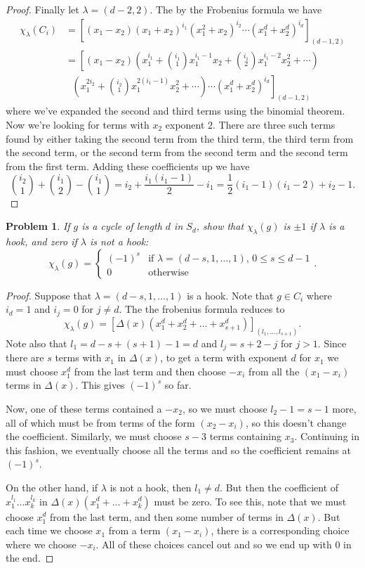 \documentclass{article}
\newtheorem{problem}{Problem}
\begin{document}
\begin{proof}
Finally let $\lambda = (d-2,2)$. The by the Frobenius formula we have
\begin{align*}
\chi_{\lambda}(C_i)
&= \left [(x_1-x_2)(x_1 + x_2)^{i_1}(x_1^2 + x_2)^{i_2} \cdots (x_1^d + x_2^d)^{i_d} \right ]_{(d-1,2)}\\
&= \left [(x_1-x_2) \left (x_1^{i_1} + \binom{i_1}{1} x_1^{i_1-1}x_2 + \binom{i_1}{2} x_1^{i_1-2}x_2^2 + \cdots \right ) \right.\\
&~~~\left. \left (x_1^{2i_2} + \binom{i_2}{1} x_1^{2(i_1-1)} x_2^2 + \cdots \right ) \cdots (x_1^d + x_2^d)^{i_d} \right ]_{(d-1,2)}
\end{align*}
where we've expanded the second and third terms using the binomial theorem. Now we're looking for terms with $x_2$ exponent $2$. There are three such terms found by either taking the second term from the third term, the third term from the second term, or the second term from the second term and the second term from the first term. Adding these coefficients up we have
\[
\binom{i_2}{1} + \binom{i_1}{2} - \binom{i_1}{1} = i_2 + \frac{i_1(i_1-1)}{2} - i_1 = \frac{1}{2} (i_1 - 1)(i_1 - 2) + i_2 - 1.
\]
\end{proof}

\begin{problem}
If $g$ is a cycle of length $d$ in $S_d$, show that $\chi_{\lambda}(g)$ is $\pm 1$ if $\lambda$ is a hook, and zero if $\lambda$ is not a hook:
\[
\chi_{\lambda}(g) =
\begin{cases}
(-1)^s & \text{if $\lambda = (d-s, 1, \dots , 1)$, $0 \leq s \leq d-1$}\\
0 & \text{otherwise}
\end{cases}.
\]
\end{problem}
\begin{proof}
Suppose that $\lambda = (d-s, 1, \dots , 1)$ is a hook. Note that $g \in C_i$ where $i_d = 1$ and $i_j = 0$ for $j \neq d$. The the frobenius formula reduces to
\[
\chi_{\lambda}(g) = [\Delta(x)(x_1^d + x_2^d + \dots + x_{s+1}^d)]_{(l_1, \dots , l_{s+1})}.
\]
Note also that $l_1 = d-s + (s+1)-1 = d$ and $l_j = s+2-j$ for $j > 1$. Since there are $s$ terms with $x_1$ in $\Delta(x)$, to get a term with exponent $d$ for $x_1$ we must choose $x_1^d$ from the last term and then choose $-x_i$ from all the $(x_1 - x_i)$ terms in $\Delta(x)$. This gives $(-1)^s$ so far.

Now, one of these terms contained a $-x_2$, so we must choose $l_2-1 = s-1$ more, all of which must be from terms of the form $(x_2 - x_i)$, so this doesn't change the coefficient. Similarly, we must choose $s-3$ terms containing $x_3$. Continuing in this fashion, we eventually choose all the terms and so the coefficient remains at $(-1)^s$.

On the other hand, if $\lambda$ is not a hook, then $l_1 \neq d$. But then the coefficient of $x_1^{l_1} \dots x_k^{l_k}$ in $\Delta(x) (x_1^d + \dots + x_k^d)$ must be zero. To see this, note that we must choose $x_1^d$ from the last term, and then some number of terms in $\Delta(x)$. But each time we choose $x_1$ from a term $(x_1 - x_i)$, there is a corresponding choice where we choose $-x_i$. All of these choices cancel out and so we end up with $0$ in the end.
\end{proof}
\end{document}
